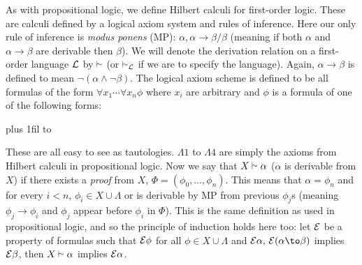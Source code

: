 As with propositional logic, we define Hilbert calculi for first-order logic.
These are calculi defined by a logical axiom system and rules of inference.
Here our only rule of inference is {\it modus ponens} (MP): $\alpha,\alpha\to\beta{/}\beta$ (meaning if both $\alpha$ and $\alpha\to\beta$ are derivable then $\beta$).
We will denote the derivation relation on a first-order language ${\cal L}$ by $\vsim$ (or $\vsim_{\cal L}$ if we are to specify the language).
Again, $\alpha\to\beta$ is defined to mean $\neg(\alpha\land\neg\beta)$.
The logical axiom scheme is defined to be all formulas of the form $\forall x_1\cdots\forall x_n\phi$ where $x_i$ are arbitrary and $\phi$ is a formula of one of the following forms:

\medskip
\tabskip=0pt plus 1fil
{\jot\halign to }
\medskip

These are all easy to see as tautologies.
$\Lambda1$ to $\Lambda4$ are simply the axioms from Hilbert calculi in propositional logic.
Now we say that $X\vsim\alpha$ ($\alpha$ is derivable from $X$) if there exists a {\it proof} from $X$, $\Phi=(\phi_0,\dots,\phi_n)$.
This means that $\alpha=\phi_n$ and for every $i<n$, $\phi_i\in X\cup\Lambda$ or is derivable by MP from previous $\phi_j$s (meaning $\phi_j\to\phi_i$ and $\phi_j$ appear before $\phi_i$ in $\Phi$).
This is the same definition as used in propositional logic, and so the principle of induction holds here too: let ${\cal E}$ be a property of formulas such that ${\cal E}\phi$ for all $\phi\in X\cup\Lambda$
and ${\cal E}\alpha,\,{\cal E}(\alpha\to\beta)$ implies ${\cal E}\beta$, then $X\vsim\alpha$ implies ${\cal E}\alpha$.


